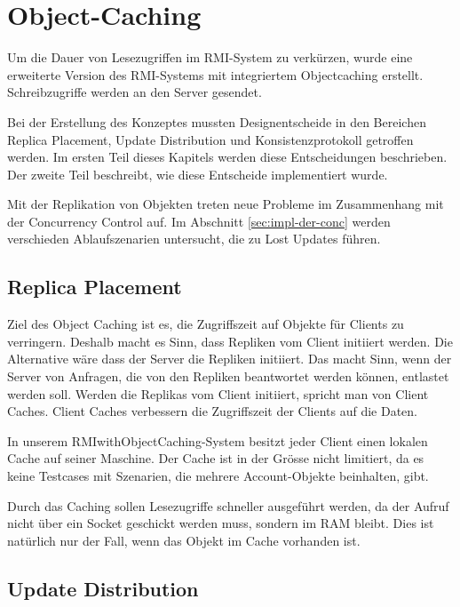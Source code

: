 \chapter{Object-Caching}
\label{sec:object-caching}

Um die Dauer von Lesezugriffen im RMI-System zu verkürzen, wurde eine erweiterte Version des RMI-Systems mit integriertem Objectcaching erstellt. Schreibzugriffe werden an den Server gesendet. 

Bei der Erstellung des Konzeptes mussten Designentscheide in den Bereichen Replica Placement, Update Distribution und Konsistenzprotokoll getroffen werden. Im ersten Teil dieses Ka\-pi\-tels werden diese Ent\-schei\-dun\-gen be\-schrie\-ben. Der zweite Teil beschreibt, wie diese Entscheide implementiert wurde.

Mit der Replikation von Objekten treten neue Probleme im Zusammenhang mit der Concurrency Control auf. Im Abschnitt \ref{sec:impl-der-conc} werden verschieden Ablaufszenarien untersucht, die zu Lost Updates führen.

\section{Replica Placement}
\label{sec:replica-management}

Ziel des Object Caching ist es, die Zugriffszeit auf Objekte für Clients zu verringern. Deshalb macht es Sinn, dass Repliken vom Client initiiert werden. Die Alternative wäre dass der Server die Repliken initiiert. Das macht Sinn, wenn der Server von Anfragen, die von den Repliken beantwortet werden können, entlastet werden soll. Werden die Replikas vom Client initiiert, spricht man von Client Caches. Client Caches verbessern die Zugriffszeit der Clients auf die Daten.

In unserem RMIwithObjectCaching-System besitzt jeder Client einen lokalen Cache auf seiner Maschine. Der Cache ist in der Grösse nicht limitiert, da es keine Testcases mit Szenarien, die mehrere Account-Objekte beinhalten, gibt. 

Durch das Caching sollen Lesezugriffe schneller ausgeführt werden, da der Aufruf nicht über ein Socket geschickt werden muss, sondern im RAM bleibt. Dies ist natürlich nur der Fall, wenn das Objekt im Cache vorhanden ist.

\section{Update Distribution}
\label{sec:update-distribution}

